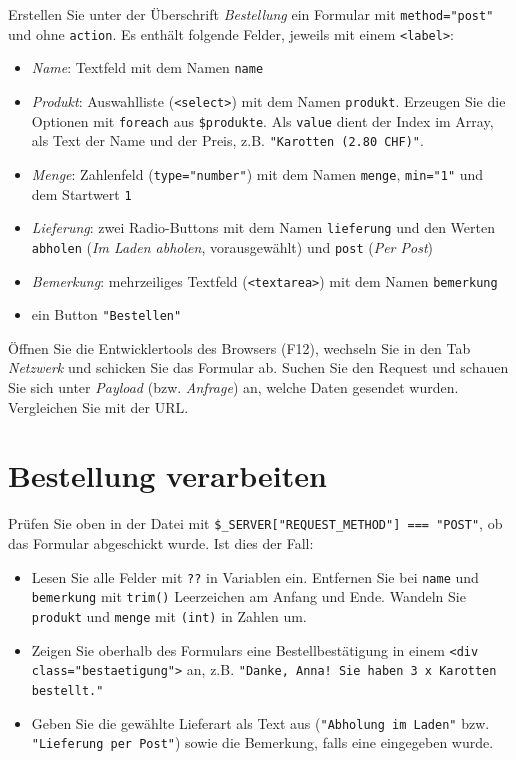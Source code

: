 \documentclass[a4paper,12pt]{article}
\begin{document}
Erstellen Sie unter der Überschrift \emph{Bestellung} ein Formular mit \texttt{method="{}post"{}} und ohne \texttt{action}. Es enthält folgende Felder, jeweils mit einem \texttt{<label>}:

\begin{itemize}
    \item \emph{Name}: Textfeld mit dem Namen \texttt{name}
    \item \emph{Produkt}: Auswahlliste (\texttt{<select>}) mit dem Namen \texttt{produkt}. Erzeugen Sie die Optionen mit \texttt{foreach} aus \texttt{\$produkte}. Als \texttt{value} dient der Index im Array, als Text der Name und der Preis, z.B. \texttt{"{}Karotten (2.80 CHF)"{}}.
    \item \emph{Menge}: Zahlenfeld (\texttt{type="{}number"{}}) mit dem Namen \texttt{menge}, \texttt{min="{}1"{}} und dem Startwert \texttt{1}
    \item \emph{Lieferung}: zwei Radio-Buttons mit dem Namen \texttt{lieferung} und den Werten \texttt{abholen} (\emph{Im Laden abholen}, vorausgewählt) und \texttt{post} (\emph{Per Post})
    \item \emph{Bemerkung}: mehrzeiliges Textfeld (\texttt{<textarea>}) mit dem Namen \texttt{bemerkung}
    \item ein Button \texttt{"{}Bestellen"{}}
\end{itemize}

Öffnen Sie die Entwicklertools des Browsers (F12), wechseln Sie in den Tab \emph{Netzwerk} und schicken Sie das Formular ab. Suchen Sie den Request und schauen Sie sich unter \emph{Payload} (bzw. \emph{Anfrage}) an, welche Daten gesendet wurden. Vergleichen Sie mit der URL.

\section{Bestellung verarbeiten}

Prüfen Sie oben in der Datei mit \texttt{\$\_SERVER["{}REQUEST\_METHOD"{}] === "{}POST"{}}, ob das Formular abgeschickt wurde. Ist dies der Fall:

\begin{itemize}
    \item Lesen Sie alle Felder mit \texttt{??} in Variablen ein. Entfernen Sie bei \texttt{name} und \texttt{bemerkung} mit \texttt{trim()} Leerzeichen am Anfang und Ende. Wandeln Sie \texttt{produkt} und \texttt{menge} mit \texttt{(int)} in Zahlen um.
    \item Zeigen Sie oberhalb des Formulars eine Bestellbestätigung in einem \texttt{<div class="{}bestaetigung"{}>} an, z.B. \texttt{"{}Danke, Anna! Sie haben 3 x Karotten bestellt."{}}
    \item Geben Sie die gewählte Lieferart als Text aus (\texttt{"{}Abholung im Laden"{}} bzw. \texttt{"{}Lieferung per Post"{}}) sowie die Bemerkung, falls eine eingegeben wurde.
\end{itemize}
\end{document}
